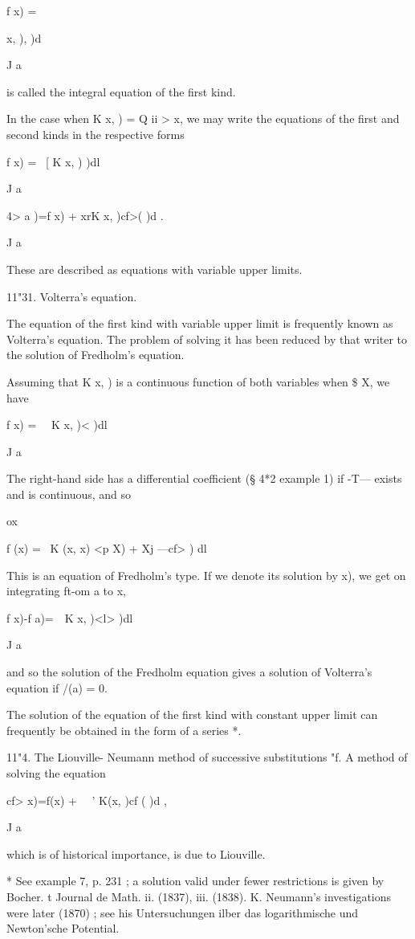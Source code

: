 f x) = \ \ \ \ {x, ), )d

J a

is called the integral equation of the first kind.

In the case when K x, ) = Q ii > x, we may write the equations of the
first and second kinds in the respective forms

f x) = \ [ K x, ) )dl

J a

4> a )=f x) + xrK x, )cf>( )d .

J a

These are described as equations with variable upper limits.

11"31. Volterra's equation.

The equation of the first kind with variable upper limit is frequently
known as Volterra's equation. The problem of solving it has been
reduced by that writer to the solution of Fredholm's equation.

Assuming that K x, ) is a continuous function of both variables when
\$ X, we have

f x) = \ \ K x, )< )dl

J a

The right-hand side has a differential coefficient (§ 4*2 example 1)
if -T— exists and is continuous, and so

ox

f (x) = \ K (x, x) <p X) + Xj —cf> ) dl

This is an equation of Fredholm's type. If we denote its solution by
x), we get on integrating ft-om a to x,

f x)-f a)=\ \ K x, )<l> )dl

J a

and so the solution of the Fredholm equation gives a solution of
Volterra's equation if /(a) = 0.

The solution of the equation of the first kind with constant upper
limit can frequently be obtained in the form of a series *.

11"4. The Liouville- Neumann method of successive substitutions "f. A
method of solving the equation

cf> x)=f(x) + \ \ ' K(x, )cf ( )d ,

J a

which is of historical importance, is due to Liouville.

* See example 7, p. 231 ; a solution valid under fewer restrictions is
given by Bocher. t Journal de Math. ii. (1837), iii. (1838). K.
Neumann's investigations were later (1870) ; see his Untersuchungen
ilber das logarithmische und Newton'sche Potential.



}
